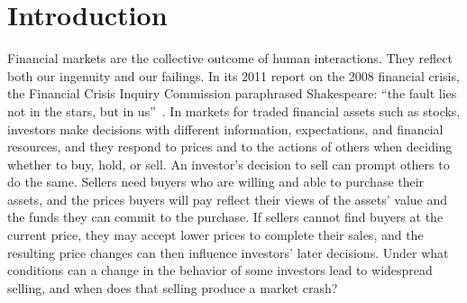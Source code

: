 \section{Introduction}

Financial markets are the collective outcome of human interactions.
They reflect both our ingenuity and our failings. In its 2011 report on
the 2008 financial crisis, the Financial Crisis Inquiry Commission
paraphrased Shakespeare: ``the fault lies not in the stars, but in us''~\cite[p.~xvii]{fcic2011financial}.
In markets for traded financial assets such as stocks, investors make
decisions with different information, expectations, and financial
resources, and they respond to prices and to the actions of others when
deciding whether to buy, hold, or sell. An investor's decision to sell
can prompt others to do the same. Sellers need buyers who are willing
and able to purchase their assets, and the prices buyers will pay
reflect their views of the assets' value and the funds they can commit
to the purchase. If sellers cannot find buyers at the current price,
they may accept lower prices to complete their sales, and the resulting
price changes can then influence investors' later decisions. Under what
conditions can a change in the behavior of some investors lead to
widespread selling, and when does that selling produce a market crash?

